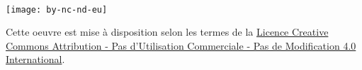 ~\vfill
\begin{center}
	\begin{minipage}[c]{0.25\linewidth}
		\raggedright\texttt{[image: by-nc-nd-eu]}
	\end{minipage}\hfill
\end{center}

Cette oeuvre est mise à disposition selon les termes de la \href{https://creativecommons.org/licenses/by-nc-nd/4.0/deed.fr}{Licence Creative Commons Attribution - Pas d’Utilisation Commerciale - Pas de Modification 4.0 International}.
